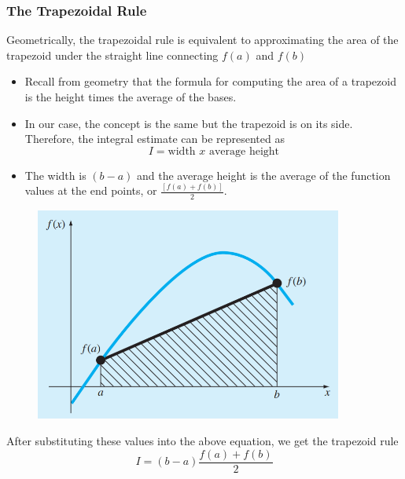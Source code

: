 \documentclass{if-beamer}
\begin{document}
\begin{frame}
	\frametitle{The Trapezoidal Rule}
	Geometrically, the trapezoidal rule is equivalent to approximating the area of the trapezoid under the straight line connecting $f(a)$ and $f(b)$\\\vspace{10pt}
	\begin{minipage}{0.5\textwidth}
		\begin{itemize}
			\item  Recall from geometry
			that the formula for computing the area of a trapezoid is the height times the average of the
			bases. 
			\item  In our case, the concept is the same but the trapezoid is on its side. Therefore, the
			integral estimate can be represented as
			$$I = \textrm{width } x \textrm{ average height}$$
			\item The width is $(b-a)$ and the average height is the average of the function values at
			the end points, or $\frac{[ f(a) + f(b)]}{2}$.\\\vspace{3pt}
		\end{itemize}
	\end{minipage}
	\begin{minipage}{0.5\textwidth}
		\begin{figure}
			\centering
			\includegraphics[width=0.9\textwidth]{figures/traprule}
		\end{figure}
	\end{minipage}
After substituting these values into the above equation, we get the trapezoid rule
$$I = (b-a)\frac{f(a)+f(b)}{2}$$

\end{frame}
\end{document}
